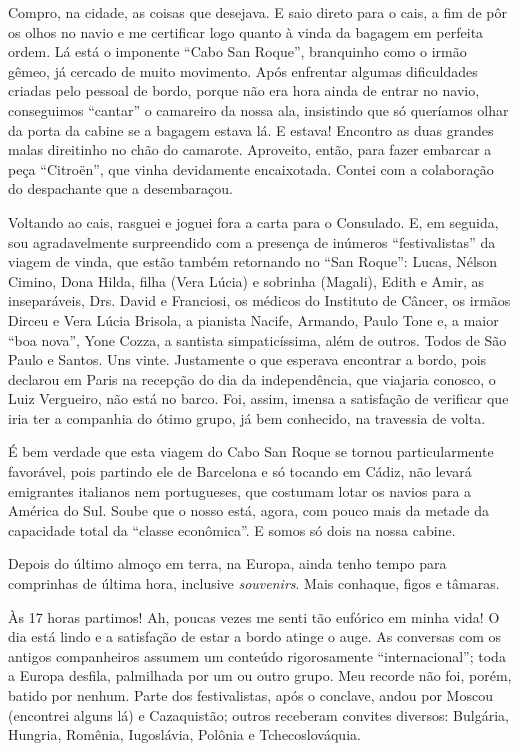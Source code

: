 Compro, na cidade, as coisas que desejava. E saio direto para o cais, a fim de pôr os olhos no navio e me certificar logo quanto à vinda da bagagem em perfeita ordem. Lá está o imponente ``Cabo San Roque'', branquinho como o irmão gêmeo, já cercado de muito movimento. Após enfrentar algumas dificuldades criadas pelo pessoal de bordo, porque não era hora ainda de entrar no navio, conseguimos ``cantar'' o camareiro da nossa ala, insistindo que só queríamos olhar da porta da cabine se a bagagem estava lá. E estava! Encontro as duas grandes malas direitinho no chão do camarote. Aproveito, então, para fazer embarcar a peça ``Citroën'', que vinha devidamente encaixotada. Contei com a colaboração do despachante que a desembaraçou.

Voltando ao cais, rasguei e joguei fora a carta para o Consulado. E, em seguida, sou agradavelmente surpreendido com a presença de inúmeros ``festivalistas'' da viagem de vinda, que estão também retornando no ``San Roque'': Lucas, Nélson Cimino, Dona Hilda, filha (Vera Lúcia) e sobrinha (Magali), Edith e Amir, as inseparáveis, Drs. David e Franciosi, os médicos do Instituto de Câncer, os irmãos Dirceu e Vera Lúcia Brisola, a pianista Nacife, Armando, Paulo Tone e, a maior ``boa nova'', Yone Cozza, a santista simpaticíssima, além de outros. Todos de São Paulo e Santos. Uns vinte. Justamente o que esperava encontrar a bordo, pois declarou em Paris na recepção do dia da independência, que viajaria conosco, o Luiz Vergueiro, não está no barco. Foi, assim, imensa a satisfação de verificar que iria ter a companhia do ótimo grupo, já bem conhecido, na travessia de volta.

É bem verdade que esta viagem do Cabo San Roque se tornou particularmente favorável, pois partindo ele de Barcelona e só tocando em Cádiz, não levará emigrantes italianos nem portugueses, que costumam lotar os navios para a América do Sul. Soube que o nosso está, agora, com pouco mais da metade da capacidade total da ``classe econômica''. E somos só dois na nossa cabine.

Depois do último almoço em terra, na Europa, ainda tenho tempo para comprinhas de última hora, inclusive \textit{souvenirs}. Mais conhaque, figos e tâmaras.

Às 17 horas partimos! Ah, poucas vezes me senti tão eufórico em minha vida! O dia está lindo e a satisfação de estar a bordo atinge o auge. As conversas com os antigos companheiros assumem um conteúdo rigorosamente ``internacional''; toda a Europa desfila, palmilhada por um ou outro grupo. Meu recorde não foi, porém, batido por nenhum. Parte dos festivalistas, após o conclave, andou por Moscou (encontrei alguns lá) e Cazaquistão; outros receberam convites diversos: Bulgária, Hungria, Romênia, Iugoslávia, Polônia e Tchecoslováquia.

